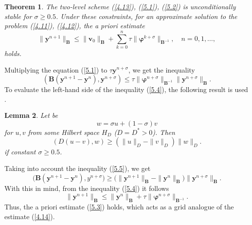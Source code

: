 \documentclass[3p]{elsarticle}
\newtheorem{thm}{Theorem}
\newtheorem{lem}[thm]{Lemma}
\numberwithin{equation}{section}
\begin{document}
\begin{thm}\label{t-4}
The two-level scheme (\ref{4.13}), (\ref{5.1}), (\ref{5.2}) 
is unconditionally stable for $\sigma \geq 0.5$.
Under these constraints, for an approximate solution to the problem (\ref{4.11}), (\ref{4.12}), the a priori estimate
\begin{equation}\label{5.3}
 \|\bm y^{n+1}\|_{\bm B} \leq \|\bm v_0\|_{\bm B}  + \sum_{k=0}^{n}\tau  \|\bm \varphi^{k+\sigma}\|_{\bm B^{-1}} ,
 \quad n = 0,1,\ldots ,
\end{equation} 
holds.
\end{thm}

\begin{pf}
Multiplying the equation (\ref{5.1}) to $\tau \bm y^{n+\sigma}$, we get the inequality
\begin{equation}\label{5.4}
 (\bm B (\bm y^{n+1} - \bm y^{n}), \bm y^{n+\sigma}) \leq \tau \|\bm \varphi^{n+\sigma}\|_{\bm B^{-1}}  \|\bm y^{n+\sigma }\|_{\bm B} .
\end{equation}  
To evaluate the left-hand side of the inequality (\ref{5.4}), the following result is used \cite{vabishchevich2013flux}.

\begin{lem}\label{l-1}
Let be
\[
  w = \sigma u + (1-\sigma) v  
\] 
for $u, v$ from some Hilbert space $H_D$ ($D=D^* >0$).
Then
\begin{equation}\label{5.5}
  (D(u-v),w) \geq (\|u\|_D - \|v\|_D) \|w\|_D .
\end{equation}
if constant $\sigma \geq 0.5$. 
\end{lem}

Taking into account the inequality (\ref{5.5}), we get
\[
 \big (\bm B (\bm y^{n+1} - \bm y^{n}), y^{n+\sigma} \big ) \geq 
 \big (\|\bm y^{n+1}\|_{\bm B} - \|\bm y^{n}\|_{\bm B} \big ) \|\bm y^{n+\sigma}\|_{\bm B} .
\] 
With this in mind, from the inequality (\ref{5.4}) it follows
\[
 \|\bm y^{n+1}\|_{\bm B} \leq  \|\bm y^{n}\|_{\bm B} + \tau \|\bm \varphi^{n+\sigma}\|_{\bm B^{-1}} .
\] 
Thus, the a priori estimate (\ref{5.3}) holds, which acts as a grid analogue of the estimate (\ref{4.14}).
\end{pf}
\end{document}
